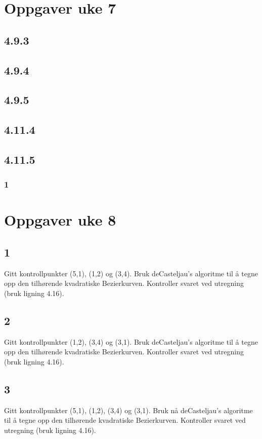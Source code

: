 \documentclass[a4paper,norsk]{article}
\begin{document}
\section{Oppgaver uke 7}

\subsection{4.9.3}

\subsection{4.9.4}

\subsection{4.9.5}

\subsection{4.11.4}

\subsection{4.11.5}
\subsubsection{1}

\section{Oppgaver uke 8}
\subsection{1}
Gitt kontrollpunkter (5,1), (1,2) og (3,4). Bruk deCasteljau's algoritme til å tegne opp den tilhørende kvadratiske Bezierkurven. Kontroller svaret ved utregning (bruk ligning 4.16).
\subsection{2}
Gitt kontrollpunkter (1,2), (3,4) og (3,1). Bruk deCasteljau's algoritme til å tegne opp den tilhørende kvadratiske Bezierkurven. Kontroller svaret ved utregning (bruk ligning 4.16).
\subsection{3}
Gitt kontrollpunkter (5,1), (1,2), (3,4) og (3,1). Bruk nå deCasteljau's algoritme til å tegne opp den tilhørende kvadratiske Bezierkurven. Kontroller svaret ved utregning (bruk ligning 4.16).
\end{document}
